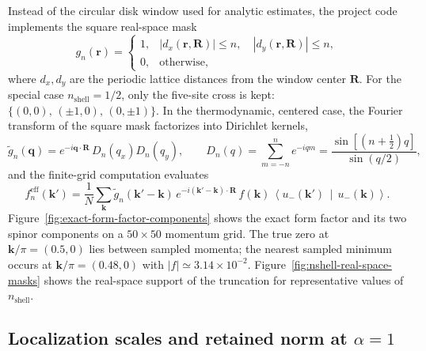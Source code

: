\documentclass[aps,prb,onecolumn,nofootinbib,superscriptaddress]{revtex4-2}
\newcommand{\mbf}[1]{\mathbf{#1}}
\newcommand{\braket}[2]{\left\langle#1\,\middle|\,#2\right\rangle}
\begin{document}
Instead of the circular disk window used for analytic estimates, the project code implements the square real-space mask
\begin{equation}
g_n(\mbf{r}) = \begin{cases}1, & |d_x(\mbf{r},\mbf{R})|\leq n,\quad |d_y(\mbf{r},\mbf{R})|\leq n,\\ 0, & \text{otherwise},\end{cases}
\end{equation}
where $d_x,d_y$ are the periodic lattice distances from the window center $\mbf{R}$. For the special case $n_{\mathrm{shell}}=1/2$, only the five-site cross is kept: $\{(0,0),\,(\pm 1,0),\,(0,\pm 1)\}$. In the thermodynamic, centered case, the Fourier transform of the square mask factorizes into Dirichlet kernels,
\begin{equation}
\widetilde{g}_n(\mbf{q}) = e^{-i\mbf{q}\cdot\mbf{R}}\,D_n(q_x)D_n(q_y),
\qquad
D_n(q) = \sum_{m=-n}^{n}e^{-iqm} = \frac{\sin[(n+\frac{1}{2})q]}{\sin(q/2)},
\end{equation}
and the finite-grid computation evaluates
\begin{equation}
f_n^{\mathrm{eff}}(\mbf{k}') = \frac{1}{N}\sum_{\mbf{k}} \widetilde{g}_n(\mbf{k}'-\mbf{k})\,e^{-i(\mbf{k}'-\mbf{k})\cdot\mbf{R}}\, f(\mbf{k})\,\braket{u_-(\mbf{k}')}{u_-(\mbf{k})}.
\end{equation}
Figure~\ref{fig:exact-form-factor-components} shows the exact form factor and its two spinor components on a $50\times 50$ momentum grid. The true zero at $\mbf{k}/\pi=(0.5,0)$ lies between sampled momenta; the nearest sampled minimum occurs at $\mbf{k}/\pi=(0.48,0)$ with $|f|\simeq 3.14\times 10^{-2}$. Figure~\ref{fig:nshell-real-space-masks} shows the real-space support of the truncation for representative values of $n_{\mathrm{shell}}$.

\subsection{Localization scales and retained norm at \texorpdfstring{$\alpha=1$}{alpha = 1}}
\label{sec:localization-scales}
\end{document}
